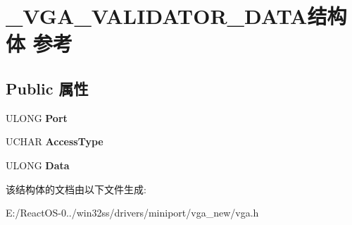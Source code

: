\hypertarget{struct___v_g_a___v_a_l_i_d_a_t_o_r___d_a_t_a}{}\section{\+\_\+\+V\+G\+A\+\_\+\+V\+A\+L\+I\+D\+A\+T\+O\+R\+\_\+\+D\+A\+T\+A结构体 参考}
\label{struct___v_g_a___v_a_l_i_d_a_t_o_r___d_a_t_a}
\subsection*{Public 属性}
\begin{DoxyCompactItemize}
\item 
\mbox{\label{struct___v_g_a___v_a_l_i_d_a_t_o_r___d_a_t_a_a1b3a6b61b47f1a28d9ac3a42b01465da}} 
U\+L\+O\+NG {\bfseries Port}
\item 
\mbox{\label{struct___v_g_a___v_a_l_i_d_a_t_o_r___d_a_t_a_a1480b2ef69371a3e098a86c1784a64a2}} 
U\+C\+H\+AR {\bfseries Access\+Type}
\item 
\mbox{\label{struct___v_g_a___v_a_l_i_d_a_t_o_r___d_a_t_a_a835c08524f0890482d57e3fe049c759d}} 
U\+L\+O\+NG {\bfseries Data}
\end{DoxyCompactItemize}


该结构体的文档由以下文件生成\+:\begin{DoxyCompactItemize}
\item 
E\+:/\+React\+O\+S-\/0../win32ss/drivers/miniport/vga\+\_\+new/vga.\+h\end{DoxyCompactItemize}
